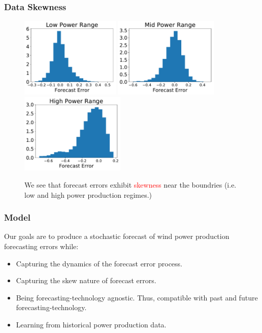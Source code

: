 \documentclass[aspectratio=169]{beamer}\usepackage[utf8]{inputenc}
\begin{document}
\begin{frame}\frametitle{Data Skewness}
\begin{figure}
  \includegraphics[width=47.5mm,scale=1]{plots/hist_low.pdf}
  \includegraphics[width=50mm,scale=1]{plots/hist_mid.pdf}
  \includegraphics[width=50mm,scale=1]{plots/hist_high.pdf}
  \caption{We see that forecast errors exhibit \textcolor{red}{skewness} near the boundries (i.e. low and high power production regimes.)}
\end{figure}
\end{frame}

\begin{frame}\frametitle{Model}

Our goals are to produce a stochastic forecast of wind power production forecasting errors while:
\begin{itemize}
  \item Capturing the dynamics of the forecast error process.
  \item Capturing the skew nature of forecast errors.
  \item Being forecasting-technology agnostic. Thus, compatible with past and future forecasting-technology.
  \item Learning from historical power production data.
\end{itemize}
\end{frame}
\end{document}
